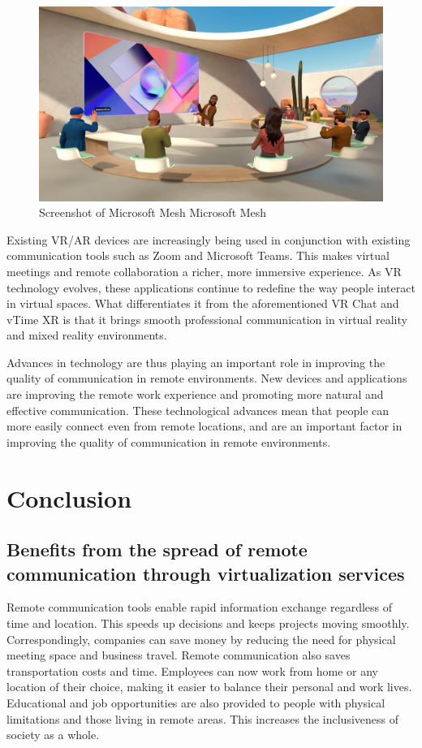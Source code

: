 \documentclass[12pt]{article}
\begin{document}
\begin{figure}[H]
    \centering
    \includegraphics[width=1\textwidth]{mesh.png}
    \caption{Screenshot of Microsoft Mesh \textcopyright Microsoft Mesh}
    \label{fig:my_label}
\end{figure}

Existing VR/AR devices are increasingly being used in conjunction with existing
communication tools such as Zoom and Microsoft Teams. This makes virtual
meetings and remote collaboration a richer, more immersive experience. As VR
technology evolves, these applications continue to redefine the way people
interact in virtual spaces. What differentiates it from the aforementioned VR
Chat and vTime XR is that it brings smooth professional communication in
virtual reality and mixed reality environments.

Advances in technology are thus playing an important role in improving the
quality of communication in remote environments. New devices and applications
are improving the remote work experience and promoting more natural and
effective communication. These technological advances mean that people can more
easily connect even from remote locations, and are an important factor in
improving the quality of communication in remote environments.

\section{Conclusion}
\subsection{Benefits from the spread of remote communication through
    virtualization services}
Remote communication tools enable rapid information exchange regardless of
time and location. This speeds up decisions and keeps projects moving smoothly.
Correspondingly, companies can save money by reducing the need for physical
meeting space and business travel. Remote communication also saves
transportation costs and time. Employees can now work from home or any location
of their choice, making it easier to balance their personal and work lives.
Educational and job opportunities are also provided to people with physical
limitations and those living in remote areas. This increases the inclusiveness
of society as a whole.
\end{document}
